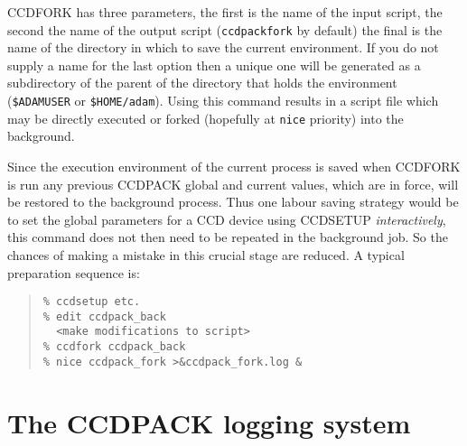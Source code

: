 \documentclass[twoside,11pt]{article}
\newcommand{\xlabel}[1]{}
\renewcommand{\_}{\texttt{\symbol{95}}}
\newenvironment{myquote}{\begin{quote}\begin{small}}{\end{small}\end{quote}}
\newcommand{\text}[1]{{\small \tt #1}}
\newcommand{\routine}[1]{{\sc #1}}
\begin{document}
\routine{CCDFORK} has three parameters, the first is the name of the input
script, the second the name of the output script (\text{ccdpack\_fork} by
default) the final is the name of the directory in which to save the
current environment. If you do not supply a name for the last option
then a unique one will be generated as a subdirectory of the parent of
the directory that holds the environment (\text{\$ADAM\_USER} or
\text{\$HOME/adam}). Using this command results in a script file which may be
directly executed or forked (hopefully at \text{nice} priority) into
the background.

Since the execution environment of the current process is saved
when \routine{CCDFORK} is run any previous CCDPACK global and current values,
which are in force, will be restored to the background process. Thus
one labour saving strategy would be to set the global parameters for a
CCD device using \routine{CCDSETUP} {\em interactively}, this command does not
then need to be repeated in the background job.  So the chances
of making a mistake in this crucial stage are reduced. A typical
preparation sequence is:
\begin{myquote}
\begin{verbatim}
% ccdsetup etc.
% edit ccdpack_back
  <make modifications to script>
% ccdfork ccdpack_back
% nice ccdpack_fork >&ccdpack_fork.log &
\end{verbatim}
\end{myquote}

\section{The CCDPACK logging system \xlabel{logsystem} \label{logsystem}}
\end{document}
